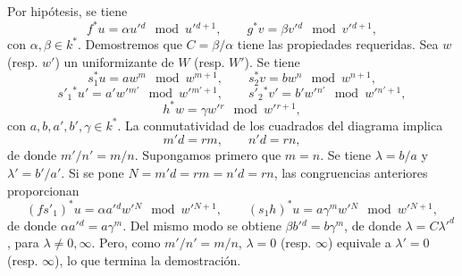 Por hipótesis, se tiene
\[
f^*u=\alpha u'{}^d\mod {u'{}^{d+1}},\qquad
g^*v=\beta v'{}^d\mod {v'{}^{d+1}},
\]
con $\alpha,\beta\in k^*$. Demostremos que $C=\beta/\alpha$ tiene las propiedades requeridas. Sea $w$ (resp. $w'$) un uniformizante de $W$ (resp. $W'$). Se tiene
\[
s_1^*u=aw^m\mod {w^{m+1}},\qquad
s_2^*v=bw^n\mod {w^{n+1}},
\]
\[
s'_1{}^*u'=a'w'{}^{m'}\mod {w'{}^{m'+1}},\qquad
s'_2{}^*v'=b'w'{}^{n'}\mod {w'{}^{n'+1}},
\]
\[
h^*w=\gamma w'{}^r\mod {w'{}^{r+1}},
\]
con $a,b,a',b',\gamma\in k^*$. La conmutatividad de los cuadrados del diagrama implica
\[
m'd=rm,\qquad n'd=rn,
\]
de donde $m'/n'=m/n$. Supongamos primero que $m=n$. Se tiene $\lambda=b/a$ y $\lambda'=b'/a'$. Si se pone $N=m'd=rm=n'd=rn$, las congruencias anteriores proporcionan
\[
(fs'_1)^*u=\alpha a'{}^d w'{}^N\mod {w'{}^{N+1}},\qquad
(s_1h)^*u=a\gamma^m w'{}^N\mod {w'{}^{N+1}},
\]
de donde $\alpha a'{}^d=a\gamma^m$. Del mismo modo se obtiene $\beta b'{}^d=b\gamma^m$, de donde $\lambda=C{\lambda'}^d$, para $\lambda\ne 0,\infty$. Pero, como $m'/n'=m/n$, $\lambda=0$ (resp. $\infty$) equivale a $\lambda'=0$ (resp. $\infty$), lo que termina la demostración.
